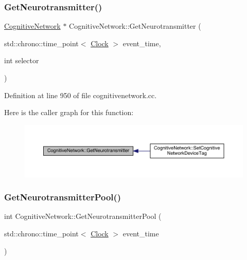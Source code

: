 \subsubsection{\texorpdfstring{Get\+Neurotransmitter()}{GetNeurotransmitter()}}
{\footnotesize\ttfamily \hyperlink{class_cognitive_network}{Cognitive\+Network} $\ast$ Cognitive\+Network\+::\+Get\+Neurotransmitter (\begin{DoxyParamCaption}\item[{std\+::chrono\+::time\+\_\+point$<$ \hyperlink{universe_8h_a0ef8d951d1ca5ab3cfaf7ab4c7a6fd80}{Clock} $>$}]{event\+\_\+time,  }\item[{int}]{selector }\end{DoxyParamCaption})}



Definition at line 950 of file cognitivenetwork.\+cc.

Here is the caller graph for this function\+:
\nopagebreak
\begin{figure}[H]
\begin{center}
\leavevmode
\includegraphics[width=350pt]{class_cognitive_network_a85890c201376061b1ffbe8fdfc1a8633_icgraph}
\end{center}
\end{figure}
\mbox{\label{class_cognitive_network_a4e5b1d60cda4ddb4bd04d8dca42b7a5b}} 
\subsubsection{\texorpdfstring{Get\+Neurotransmitter\+Pool()}{GetNeurotransmitterPool()}}
{\footnotesize\ttfamily int Cognitive\+Network\+::\+Get\+Neurotransmitter\+Pool (\begin{DoxyParamCaption}\item[{std\+::chrono\+::time\+\_\+point$<$ \hyperlink{universe_8h_a0ef8d951d1ca5ab3cfaf7ab4c7a6fd80}{Clock} $>$}]{event\+\_\+time }\end{DoxyParamCaption})\hspace{0.3cm}{\ttfamily [inline]}}



